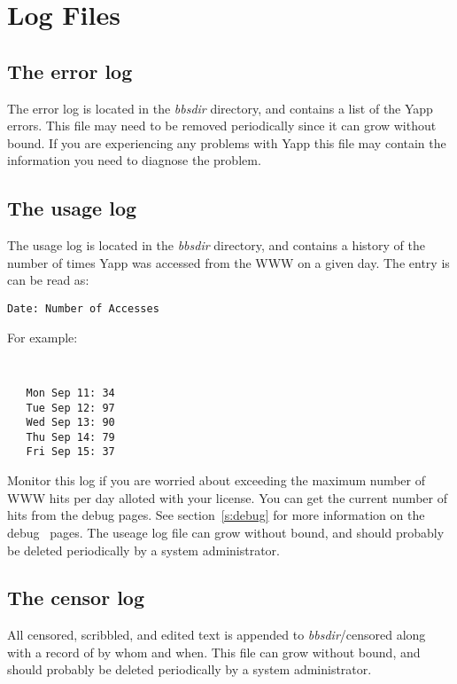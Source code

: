 \documentclass[twoside]{report}
\begin{document}
   \section{Log Files} \label{c:logfiles}
      \subsection{The error log}
         The error log is located in the {\em bbsdir} directory, 
         and contains a list of the Yapp errors.  This file may need to 
         be removed periodically since it can grow without bound.  If you are
         experiencing any problems with Yapp this file may contain the information
         you need to diagnose the problem.
   
      \subsection{The usage log}
         The usage log is located in the {\em bbsdir} directory, and  contains 
         a history of the number of times Yapp was accessed from the WWW 
         on a given day.  The entry is can be read as:
         \par
         {\tt Date: Number of Accesses}
         \par
        
         For example:
         {\tt
         \begin{verbatim}
   Mon Sep 11: 34
   Tue Sep 12: 97
   Wed Sep 13: 90
   Thu Sep 14: 79
   Fri Sep 15: 37
         \end{verbatim}
         }
   
         Monitor this log if you are worried about exceeding the
         maximum number of WWW hits per day alloted with your license.  You
         can get the current number of hits from the debug pages.  See 
         section~\ref{s:debug} for more information on the 
         debug~ pages.  The useage log file 
         can grow without bound, and should probably be deleted periodically 
         by a system administrator.
   
   
      \subsection{The censor log}
         All censored, scribbled, and edited text is appended to 
         {\em bbsdir}/censored along with a record of by whom and when.  This 
         file can grow without bound, and should probably be deleted periodically 
         by a system administrator.
   
\end{document}
